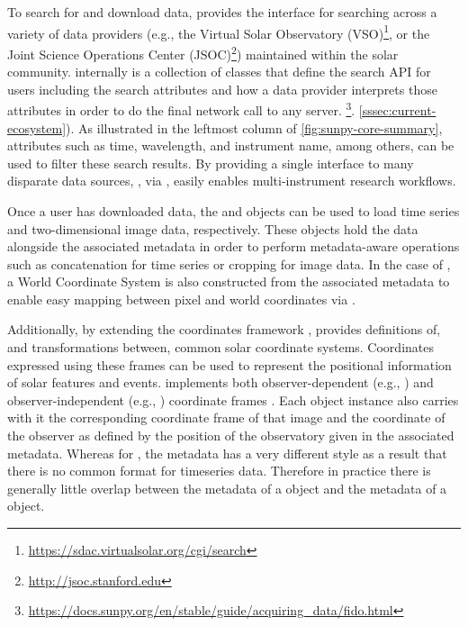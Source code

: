 To search for and download data, \sunpypkg provides the \Fido interface for searching across a variety of data providers (e.g., the Virtual Solar Observatory (VSO)\footnote{\url{https://sdac.virtualsolar.org/cgi/search}}, or the Joint Science Operations Center (JSOC)\footnote{\url{http://jsoc.stanford.edu}}) maintained within the solar community.
\Fido internally is a collection of classes that define the search API for users including the search attributes and how a data provider interprets those attributes in order to do the final network call to any server.
\footnote{\url{https://docs.sunpy.org/en/stable/guide/acquiring_data/fido.html}}.
 \citep{sunpy_community2020} 
 \autoref{sssec:current-ecosystem}).
As illustrated in the leftmost column of \autoref{fig:sunpy-core-summary}, attributes such as time, wavelength, and instrument name, among others, can be used to filter these search results.
By providing a single interface to many disparate data sources, \sunpypkg, via \Fido, easily enables multi-instrument research workflows.

Once a user has downloaded data, the  and  objects can be used to load time series and two-dimensional image data, respectively.
These objects hold the data alongside the associated metadata in order to perform metadata-aware operations such as concatenation for time series or cropping for image data.
In the case of , a World Coordinate System \citep[WCS, e.g.,][]{greisen_representations_2002} is also constructed from the associated metadata to enable easy mapping between pixel and world coordinates via \astropypkg.

Additionally, by extending the \astropypkg coordinates framework \citep[see Section 3.3 of][for more details]{the_astropy_collaboration_astropy_2018}, \sunpypkg provides definitions of, and transformations between, common solar coordinate systems.
Coordinates expressed using these frames can be used to represent the positional information of solar features and events. \sunpypkg implements both observer-dependent (e.g., \hpc) and observer-independent (e.g., \hgs) coordinate frames \citep{thompson_coordinate_2006}.
Each  object instance also carries with it the corresponding coordinate frame of that image and the coordinate of the observer as defined by the position of the observatory given in the associated metadata.
Whereas for , the metadata has a very different style as a result that there is no common format for timeseries data.
Therefore in practice there is generally little overlap between the metadata of a  object and the metadata of a  object.

